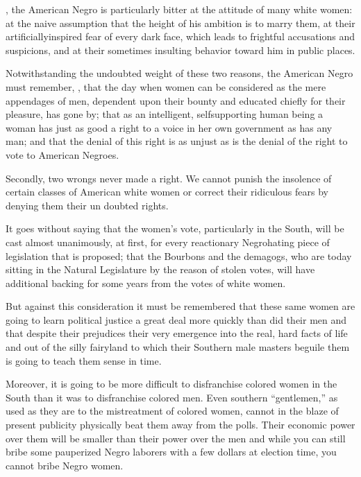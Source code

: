 \documentclass[letterpaper,10pt,english]{jupyterBook}
\begin{document}
\sphinxAtStartPar
{}, the American Negro is particularly bitter at the attitude of many white women: at the naive assumption that the height of his am­bition is to marry them, at their arti­ficially\sphinxhyphen{}inspired fear of every dark face, which leads to frightful accusa­tions and suspicions, and at their sometimes insulting behavior toward him in public places.

\sphinxAtStartPar
Notwithstanding the undoubted weight of these two reasons, the American Negro must remember, , that the day when women can be considered as the mere appendages of men, dependent upon their bounty and educated chiefly for their pleasure, has gone by; that as an in­telligent, self\sphinxhyphen{}supporting human be­ing a woman has just as good a right to a voice in her own government as has any man; and that the denial of this right is as unjust as is the denial of the right to vote to American Negroes.

\sphinxAtStartPar
Secondly, two wrongs never made a right. We cannot punish the insolence of certain classes of American white women or correct their ridicu­lous fears by denying them their un­ doubted rights.

\sphinxAtStartPar
It goes without saying that the women’s vote, particularly in the South, will be cast almost unanimously, at first, for every reactionary Negro\sphinxhyphen{}hating piece of legislation that is proposed; that the Bourbons and the demagogs, who are today sitting in the Natural Legislature by the reason of stolen votes, will have additional backing for some years from the votes of white women.

\sphinxAtStartPar
But against this consideration it must be remembered that these same women are going to learn political justice a great deal more quickly than did their men and that despite their prejudices their very emergence into the real, hard facts of life and out of the silly fairy\sphinxhyphen{}land to which their Southern male masters beguile them is going to teach them sense in time.

\sphinxAtStartPar
Moreover, it is going to be more difficult to disfranchise colored women in the South than it was to disfranchise colored men. Even southern “gentlemen,” as used as they are to the mistreatment of colored wom­en, cannot in the blaze of present publicity physically beat them away from the polls. Their economic power over them will be smaller than their power over the men and while you can still bribe some pauperized Negro laborers with a few dollars at election time, you cannot bribe Negro women.
\end{document}
